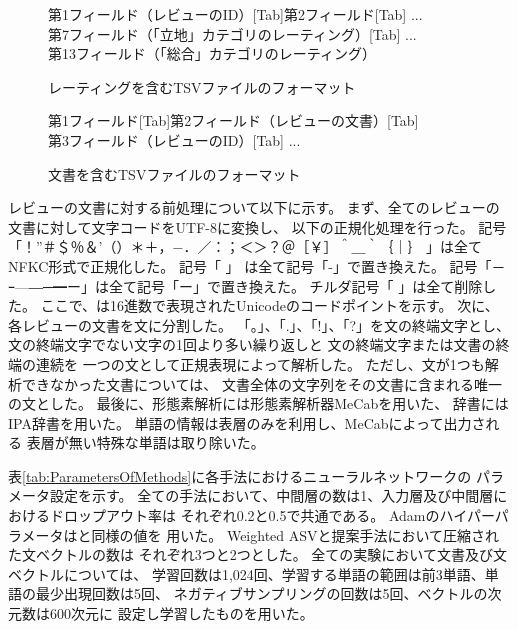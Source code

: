 \begin{figure}
  第1フィールド（レビューのID）{[Tab]}第2フィールド{[Tab]} ... \\
  第7フィールド（「立地」カテゴリのレーティング）{[Tab]} ... \\
  第13フィールド（「総合」カテゴリのレーティング）
  \caption{レーティングを含むTSVファイルのフォーマット}
  \label{fig:RatingFileFormat}
\end{figure}

\begin{figure}
  第1フィールド{[Tab]}第2フィールド（レビューの文書）{[Tab]} \\
  第3フィールド（レビューのID）{[Tab]} ...
  \caption{文書を含むTSVファイルのフォーマット}
  \label{fig:DocumentFileFormat}
\end{figure}

レビューの文書に対する前処理について以下に示す。
まず、全てのレビューの文書に対して文字コードをUTF-8に変換し、
以下の正規化処理を行った。
記号「！”＃＄％＆’（）＊＋，−．／：；＜＞？＠［￥］＾＿｀｛｜｝
」は全てNFKC形式で正規化した。
記号「
」
は全て記号「-」で置き換えた。
記号「－ｰ—―─━ー」は全て記号「ー」で置き換えた。
チルダ記号「
」は全て削除した。
ここで、は16進数で表現されたUnicodeのコードポイントを示す。
次に、各レビューの文書を文に分割した。
「。」、「.」、「!」、「?」を文の終端文字とし、
文の終端文字でない文字の1回より多い繰り返しと
文の終端文字または文書の終端の連続を
一つの文として正規表現によって解析した。
ただし、文が1つも解析できなかった文書については、
文書全体の文字列をその文書に含まれる唯一の文とした。
最後に、形態素解析には形態素解析器MeCabを用いた、
辞書にはIPA辞書を用いた。
単語の情報は表層のみを利用し、MeCabによって出力される
表層が無い特殊な単語は取り除いた。

表\ref{tab:ParametersOfMethods}に各手法におけるニューラルネットワークの
パラメータ設定を示す。
全ての手法において、中間層の数は1、入力層及び中間層におけるドロップアウト率は
それぞれ0.2と0.5で共通である。
Adam\cite{diederik15}のハイパーパラメータは\cite{diederik15}と同様の値を
用いた。
Weighted ASVと提案手法において圧縮された文ベクトルの数は
それぞれ3つと2つとした。
全ての実験において文書及び文ベクトルについては、
学習回数は1,024回、学習する単語の範囲は前3単語、単語の最少出現回数は5回、
ネガティブサンプリングの回数は5回、ベクトルの次元数は600次元に
設定し学習したものを用いた。

